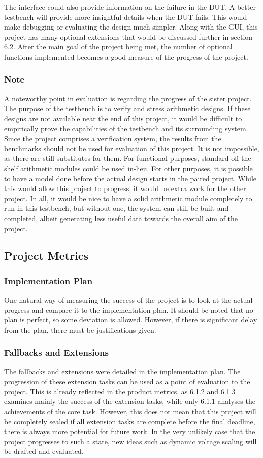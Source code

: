 The interface could also provide information on the failure in the DUT.
A better testbench will provide more insightful details when the DUT fails.
This would make debugging or evaluating the design much simpler.
Along with the GUI, this project has many optional extensions that would be discussed further in section 6.2.
After the main goal of the project being met, the number of optional functions implemented becomes a good measure of the progress of the project.

\subsubsection{Note}
A noteworthy point in evaluation is regarding the progress of the sister project.
The purpose of the testbench is to verify and stress arithmetic designs.
If these designs are not available near the end of this project, it would be difficult to empirically prove the capabilities of the testbench and its surrounding system.
Since the project comprises a verification system, the results from the benchmarks should not be used for evaluation of this project.
It is not impossible, as there are still substitutes for them.
For functional purposes, standard off-the-shelf arithmetic modules could be used in-lieu.
For other purposes, it is possible to have a model done before the actual design starts in the paired project.
While this would allow this project to progress, it would be extra work for the other project.
In all, it would be nice to have a solid arithmetic module completely to run in this testbench, but without one, the system can still be built and completed, albeit generating less useful data towards the overall aim of the project.

\subsection{Project Metrics}
\subsubsection{Implementation Plan}
One natural way of measuring the success of the project is to look at the actual progress and compare it to the implementation plan.
It should be noted that no plan is perfect, so some deviation is allowed.
However, if there is significant delay from the plan, there must be justifications given.

\subsubsection{Fallbacks and Extensions}
The fallbacks and extensions were detailed in the implementation plan.
The progression of these extension tasks can be used as a point of evaluation to the project.
This is already reflected in the product metrics, as 6.1.2 and 6.1.3 examines mainly the success of the extension tasks, while only 6.1.1 analyses the achievements of the core task.
However, this does not mean that this project will be completely sealed if all extension tasks are complete before the final deadline, there is always more potential for future work.
In the very unlikely case that the project progresses to such a state, new ideas such as dynamic voltage scaling will be drafted and evaluated.
